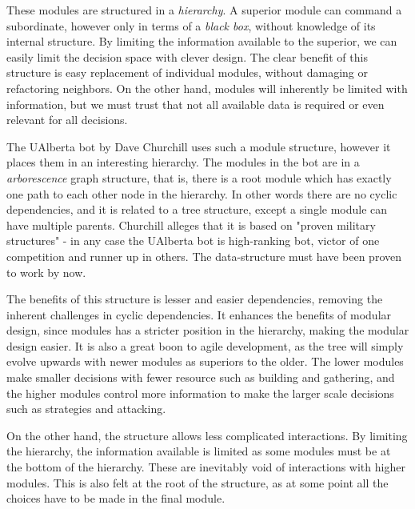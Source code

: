 These modules are structured in a \emph{hierarchy}. A superior module can command a subordinate, however only in terms of a \emph{black box}, without knowledge of its internal structure. By limiting the information available to the superior, we can easily limit the decision space with clever design. The clear benefit of this structure is easy replacement of individual modules, without damaging or refactoring neighbors. On the other hand, modules will inherently be limited with information, but we must trust that not all available data is required or even relevant for all decisions.

The UAlberta bot by Dave Churchill uses such a module structure, however it places them in an interesting hierarchy. The modules in the bot are in a \emph{arborescence} graph structure, that is, there is a root module which has exactly one path to each other node in the hierarchy. In other words there are no cyclic dependencies, and it is related to a tree structure, except a single module can have multiple parents. Churchill alleges that it is based on "proven military structures" - in any case the UAlberta bot is high-ranking bot, victor of one competition and runner up in others. The data-structure must have been proven to work by now.

The benefits of this structure is lesser and easier dependencies, removing the inherent challenges in cyclic dependencies. It enhances the benefits of modular design, since modules has a stricter position in the hierarchy, making the modular design easier. It is also a great boon to agile development, as the tree will simply evolve upwards with newer modules as superiors to the older. The lower modules make smaller decisions with fewer resource such as building and gathering, and the higher modules control more information to make the larger scale decisions such as strategies and attacking.

On the other hand, the structure allows less complicated interactions. By limiting the hierarchy, the information available is limited as some modules must be at the bottom of the hierarchy. These are inevitably void of interactions with higher modules. This is also felt at the root of the structure, as at some point all the choices have to be made in the final module.

